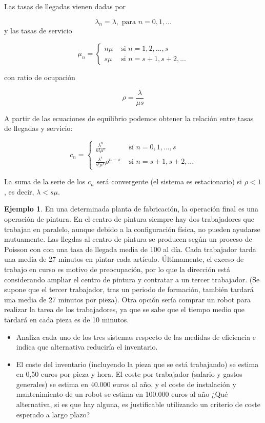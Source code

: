 \documentclass[
]{book}
\providecommand{\tightlist}{%
  \setlength{\itemsep}{0pt}\setlength{\parskip}{0pt}}
\theoremstyle{definition}
\theoremstyle{definition}
\newtheorem{example}{Ejemplo}[chapter]
\theoremstyle{definition}
\theoremstyle{definition}
\theoremstyle{remark}
\begin{document}
Las tasas de llegadas vienen dadas por

\[\lambda_n = \lambda, \text{ para } n = 0, 1,...\]
y las tasas de servicio

\[\mu_n = 
\begin{cases}
n\mu & \text{ si } n = 1, 2,...,s\\
s\mu & \text{ si } n = s+1, s+2,...
\end{cases}
\]

con ratio de ocupación

\[\rho = \frac{\lambda}{\mu s}\]

A partir de las ecuaciones de equilibrio podemos obtener la relación entre tasas de llegadas y servicio:

\[
c_n =
\begin{cases}
\frac{\lambda^n}{n!\mu^n} & \text{ si } n = 0, 1,...,s\\
\frac{\lambda^s}{s!\mu^s}\rho^{n-s} & \text{ si } n = s+1, s+2,...
\end{cases}
\]

La suma de la serie de los \(c_n\) será convergente (el sistema es estacionario) si \(\rho < 1\), es decir,
\(\lambda < s\mu\).

\begin{example}

En una determinada planta de fabricación, la operación final es una operación de pintura. En el centro de pintura siempre hay dos trabajadores que trabajan en paralelo, aunque debido a la configuración física, no pueden ayudarse mutuamente. Las llegdas al centro de pintura se producen según un proceso de Poisson con
con una tasa de llegada media de 100 al día. Cada trabajador tarda una media de 27 minutos en pintar cada artículo. Últimamente, el exceso de trabajo en curso es motivo de preocupación, por lo que la dirección está considerando ampliar el centro de pintura y contratar a un tercer trabajador. (Se supone que el tercer trabajador, tras un periodo de formación, también tardará una media de 27 minutos por pieza). Otra opción sería comprar un robot para realizar la tarea de los trabajadores, ya que se sabe que el tiempo medio que tardará en cada pieza es de 10 minutos.

\begin{itemize}
\tightlist
\item
  Analiza cada uno de los tres sistemas respecto de las medidas de eficiencia e indica que alternativa reduciría el inventario.
\item
  El coste del inventario (incluyendo la pieza que se está trabajando) se estima en 0,50 euros por pieza y hora. El coste por trabajador (salario y gastos generales) se estima en 40.000 euros al año, y el coste de instalación y mantenimiento de un robot se estima en 100.000 euros al año ¿Qué alternativa, si es que hay alguna, es justificable utilizando un criterio de coste esperado a largo plazo?
\end{itemize}

\end{example}
\end{document}

